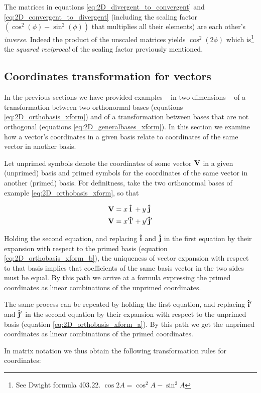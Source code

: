 The matrices in equations \ref{eq:2D_divergent_to_convergent} and \ref{eq:2D_convergent_to_divergent} (including the scaling factor $(\cos^2(\phi) - \sin^2(\phi))$ that multiplies all their elements) are each other's \textit{inverse}. Indeed the product of the unscaled matrices yields $\cos^2(2\phi)$ which is\footnote{See Dwight formula 403.22. $\cos 2A = \cos^2 A - \sin^2 A$} the \textit{squared reciprocal} of the scaling factor previously mentioned. 

\subsection{Coordinates transformation for vectors}
In the previous sections we have provided examples -- in two dimensions -- of a transformation between two orthonormal bases (equations \ref{eq:2D_orthobasis_xform}) and of a transformation between bases that are not orthogonal (equations \ref{eq:2D_generalbases_xform}). In this section we examine how a vector's coordinates in a given basis relate to coordinates of the same vector in another basis. 

Let unprimed symbols denote the coordinates of some vector $\vb{V}$ in a given (unprimed) basis and primed symbols for the coordinates of the same vector in another (primed) basis. For definitness, take the two orthonormal bases of example \ref{eq:2D_orthobasis_xform}, so that 

\begin{align*}
\vb{V} &= x \;\vu{i}\; + y\; \vu{j}\; \\
\vb{V} &= x' \vu{i}' + y' \vu{j}'  
\end{align*} 

Holding the second equation, and replacing $\vu{i}$ and $\vu{j}$ in the first equation by their expansion with respect to the primed basis (equation \ref{eq:2D_orthobasis_xform_b}), the uniqueness of vector expansion with respect to that basis implies that coefficients of the same basis vector in the two sides must be equal. By this path we arrive at a formula expressing the primed coordinates as linear combinations of the unprimed coordinates. 

The same process can be repeated by holding the first equation, and replacing $\vu{i}'$ and $\vu{j}'$ in the second equation by their expansion with respect to the unprimed basis (equation \ref{eq:2D_orthobasis_xform_a}). By this path we get the unprimed coordinates as linear combinations of the primed coordinates. 

In matrix notation we thus obtain the following transformation rules for coordinates:  

